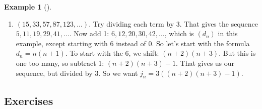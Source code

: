 \documentclass[12pt,]{book}
\theoremstyle{plain}
\theoremstyle{definition}
\theoremstyle{definition}
\newtheorem{example}[theorem]{Example}
\theoremstyle{definition}
\numberwithin{equation}{chapter}
\begin{document}
\begin{example}[]
\begin{enumerate}
\item\hypertarget{li-49}{}\hypertarget{p-77}{}%
\((15, 33, 57, 87, 123, \ldots)\). Try dividing each term by 3. That gives the sequence \(5, 11, 19, 29, 41,\ldots\). Now add 1: \(6, 12, 20, 30, 42, \ldots\), which is \((d_n)\) in this example, except starting with 6 instead of 0. So let's start with the formula \(d_n= n(n+1)\). To start with the 6, we shift: \((n+2)(n+3)\). But this is one too many, so subtract 1: \((n+2)(n+3) - 1\). That gives us our sequence, but divided by 3. So we want \(j_n = 3((n+2)(n+3) - 1)\).%
\end{enumerate}
%
\end{example}
\typeout{************************************************}
\typeout{************************************************}
\subsection*{Exercises}\label{exercises_seq_basics}
\end{document}
